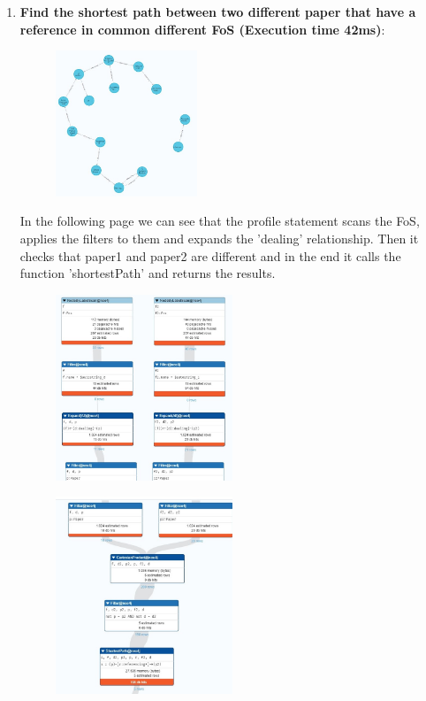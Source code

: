 \documentclass{Configuration_Files/PoliMi3i_thesis}
\begin{document}
\begin{enumerate}
\begin{figure}[H]
    \end{figure}
    \newpage
    \item \textbf{Find the shortest path between two different paper that have a reference in common different FoS (Execution time 42ms)}:
    
    \begin{figure}[H]
    \centering
    \includegraphics[width=0.4\textwidth]{Images/queries/query_10.jpg}
    \end{figure}
  In the following page we can see that the profile statement scans the FoS, applies the filters to them and expands the 'dealing' relationship. Then it checks that paper1 and paper2 are different and in the end it calls the function 'shortestPath' and returns the results.
    \begin{figure}[H]
    \centering
    \includegraphics[width=0.5\textwidth]{Images/queries/query_10_p1.jpg}
    \end{figure}
    \begin{figure}[H]
    \centering
    \includegraphics[width=0.5\textwidth]{Images/queries/query_10_p2.jpg}

\end{figure}
\end{enumerate}
\end{document}
